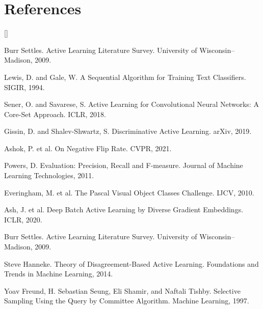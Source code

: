 \documentclass{article}
\def\beginrefs{\begin{list}
        {[\arabic{equation}]}{\usecounter{equation}
         \setlength{\leftmargin}{2.0truecm}\setlength{\labelsep}{0.4truecm}%
         \setlength{\labelwidth}{1.6truecm}}}
\def\endrefs{\end{list}}
\def\bibentry#1{\item[\hbox{[#1]}]}
\begin{document}
\section{References}

\beginrefs

\bibentry{1}
Burr Settles.
Active Learning Literature Survey.
University of Wisconsin–Madison, 2009.

\bibentry{2}
Lewis, D. and Gale, W.
A Sequential Algorithm for Training Text Classifiers.
SIGIR, 1994.

\bibentry{3}
Sener, O. and Savarese, S.
Active Learning for Convolutional Neural Networks: A Core-Set Approach.
ICLR, 2018.

\bibentry{4}
Gissin, D. and Shalev-Shwartz, S.
Discriminative Active Learning.
arXiv, 2019.

\bibentry{5}
Ashok, P. et al.
On Negative Flip Rate.
CVPR, 2021.

\bibentry{6}
Powers, D.
Evaluation: Precision, Recall and F-measure.
Journal of Machine Learning Technologies, 2011.

\bibentry{7}
Everingham, M. et al.
The Pascal Visual Object Classes Challenge.
IJCV, 2010.

\bibentry{8}
Ash, J. et al.
Deep Batch Active Learning by Diverse Gradient Embeddings.
ICLR, 2020.

\bibentry{9}
Burr Settles.
Active Learning Literature Survey.
University of Wisconsin–Madison, 2009.

\bibentry{10}
Steve Hanneke.
Theory of Disagreement-Based Active Learning.
Foundations and Trends in Machine Learning, 2014.

\bibentry{11}
Yoav Freund, H. Sebastian Seung, Eli Shamir, and Naftali Tishby.
Selective Sampling Using the Query by Committee Algorithm.
Machine Learning, 1997.

\endrefs
\end{document}

